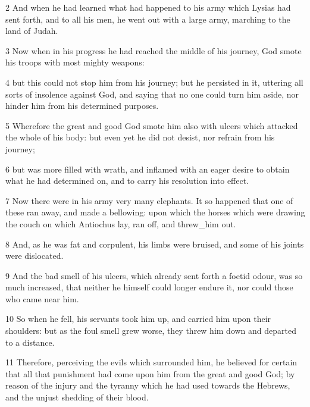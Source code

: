 \par 2 And when he had learned what had happened to his army which Lysias had sent forth, and to all his men, he went out with a large army, marching to the land of Judah. 

\par 3 Now when in his progress he had reached the middle of his journey, God smote his troops with most mighty weapons: 

\par 4 but this could not stop him from his journey; but he persisted in it, uttering all sorts of insolence against God, and saying that no one could turn him aside, nor hinder him from his determined purposes. 

\par 5 Wherefore the great and good God smote him also with ulcers which attacked the whole of his body: but even yet he did not desist, nor refrain from his journey; 

\par 6 but was more filled with wrath, and inflamed with an eager desire to obtain what he had determined on, and to carry his resolution into effect. 

\par 7 Now there were in his army very many elephants. It so happened that one of these ran away, and made a bellowing: upon which the horses which were drawing the couch on which Antiochus lay, ran off, and threw_him out. 

\par 8 And, as he was fat and corpulent, his limbs were bruised, and some of his joints were dislocated. 

\par 9 And the bad smell of his ulcers, which already sent forth a foetid odour, was so much increased, that neither he himself could longer endure it, nor could those who came near him. 

\par 10 So when he fell, his servants took him up, and carried him upon their shoulders: but as the foul smell grew worse, they threw him down and departed to a distance. 

\par 11 Therefore, perceiving the evils which surrounded him, he believed for certain that all that punishment had come upon him from the great and good God; by reason of the injury and the tyranny which he had used towards the Hebrews, and the unjust shedding of their blood. 


